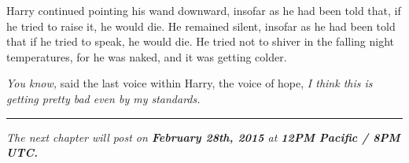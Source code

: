 Harry continued pointing his wand downward, insofar as he had been told that, if he tried to raise it, he would die. He remained silent, insofar as he had been told that if he tried to speak, he would die. He tried not to shiver in the falling night temperatures, for he was naked, and it was getting colder.

\emph{You know,} said the last voice within Harry, the voice of hope, \emph{I think this is getting pretty bad even by my standards.}

\begin{center}\rule{3in}{0.4pt}\end{center}

\emph{The next chapter will post on \textbf{February 28th, 2015} at \textbf{12PM Pacific / 8PM UTC.}}

